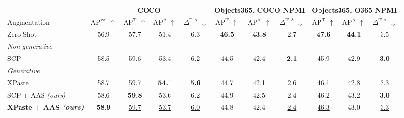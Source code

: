 \begin{tabular}{l cccc ccc ccc}
\toprule
& \multicolumn{4}{c}{\textbf{COCO}} & \multicolumn{3}{c}{\textbf{Objects365, COCO NPMI}} & \multicolumn{3}{c}{\textbf{Objects365, O365 NPMI}} \\
\cmidrule(lr){2-5} \cmidrule(lr){6-8} \cmidrule(lr){9-11}
Augmentation & $\text{AP}^{\text{val}}$ $\uparrow$ & $\text{AP}^{\text{T}}$ $\uparrow$ & $\text{AP}^{\text{A}}$ $\uparrow$ & $\Delta^{\text{T-A}}$ $\downarrow$ & $\text{AP}^{\text{T}}$ $\uparrow$ & $\text{AP}^{\text{A}}$ $\uparrow$ & $\Delta^{\text{T-A}}$ $\downarrow$ & $\text{AP}^{\text{T}}$ $\uparrow$ & $\text{AP}^{\text{A}}$ $\uparrow$ & $\Delta^{\text{T-A}}$ $\downarrow$ \\
\midrule
Zero Shot & 56.9 & 57.7 & 51.4 & 6.3 & \textbf{46.5} & \textbf{43.8} & 2.7 & \textbf{47.6} & \textbf{44.1} & 3.5 \\
\midrule
\multicolumn{11}{l}{\emph{Non-generative}} \\
SCP & 58.5 & 59.6 & 53.4 & 6.2 & 44.5 & 42.4 & \textbf{2.1} & 45.9 & 42.9 & \textbf{3.0} \\
\midrule
\multicolumn{11}{l}{\emph{Generative}} \\
XPaste & \underline{58.7} & \underline{59.7} & \textbf{54.1} & \textbf{5.6} & 44.7 & 42.1 & 2.6 & 46.1 & 42.8 & \underline{3.3} \\
\midrule
\rowcolor{oursrow} SCP + AAS \emph{(ours)} & 58.6 & \textbf{59.8} & 53.6 & 6.2 & \underline{44.9} & \underline{42.5} & \underline{2.4} & 46.2 & \underline{43.2} & \textbf{3.0} \\
\rowcolor{oursrow} \textbf{XPaste + AAS \emph{(ours)}} & \textbf{58.9} & \underline{59.7} & \underline{53.7} & \underline{6.0} & 44.8 & 42.4 & \underline{2.4} & \underline{46.3} & 43.0 & \underline{3.3} \\
\bottomrule
\end{tabular}
